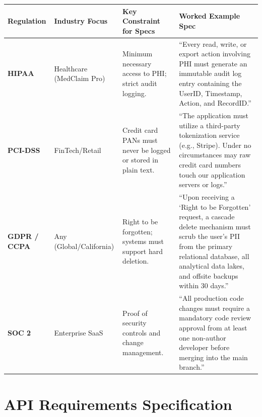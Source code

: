 \begin{longtable}[]{@{}
  >{\raggedright\arraybackslash}p{}
  >{\raggedright\arraybackslash}p{}
  >{\raggedright\arraybackslash}p{}
  >{\raggedright\arraybackslash}p{}@{}}
\toprule\noalign{}
\begin{minipage}[b]{\linewidth}\raggedright
Regulation
\end{minipage} & \begin{minipage}[b]{\linewidth}\raggedright
Industry Focus
\end{minipage} & \begin{minipage}[b]{\linewidth}\raggedright
Key Constraint for Specs
\end{minipage} & \begin{minipage}[b]{\linewidth}\raggedright
Worked Example Spec
\end{minipage} \\
\midrule\noalign{}
\endhead
\bottomrule\noalign{}
\endlastfoot
\textbf{HIPAA} & Healthcare (MedClaim Pro) & Minimum necessary access to
PHI; strict audit logging. & ``Every read, write, or export action
involving PHI must generate an immutable audit log entry containing the
UserID, Timestamp, Action, and RecordID.'' \\
\textbf{PCI-DSS} & FinTech/Retail & Credit card PANs must never be
logged or stored in plain text. & ``The application must utilize a
third-party tokenization service (e.g., Stripe). Under no circumstances
may raw credit card numbers touch our application servers or logs.'' \\
\textbf{GDPR / CCPA} & Any (Global/California) & Right to be forgotten;
systems must support hard deletion. & ``Upon receiving a `Right to be
Forgotten' request, a cascade delete mechanism must scrub the user's PII
from the primary relational database, all analytical data lakes, and
offsite backups within 30 days.'' \\
\textbf{SOC 2} & Enterprise SaaS & Proof of security controls and change
management. & ``All production code changes must require a mandatory
code review approval from at least one non-author developer before
merging into the main branch.'' \\
\end{longtable}

\section{API Requirements
Specification}\label{api-requirements-specification}

